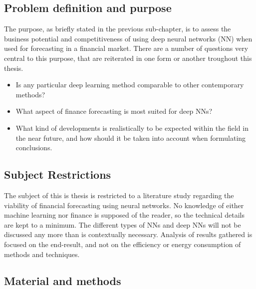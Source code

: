 \subsection{Problem definition and purpose}

The purpose, as briefly stated in the previous sub-chapter, is to assess the business potential and competitiveness of using deep neural networks (NN) when used for forecasting in a financial market. There are a number of questions very central to this purpose, that are reiterated in one form or another troughout this thesis.

\begin{itemize}

\item Is any particular deep learning method comparable to other contemporary methods?

\item What aspect of finance forecasting is most suited for deep NNs?

\item What kind of developments is realistically to be expected within the field in the near future, and how should it be taken into account when formulating conclusions.

\end{itemize}




\subsection{Subject Restrictions}

The subject of this is thesis is restricted to a literature study regarding the viability of financial forecasting using neural networks. No knowledge of either machine learning nor finance is supposed of the reader, so the technical details are kept to a minimum.
The different types of NNs and deep NNs will not be discussed any more than is contextually necessary.
Analysis of results gathered is focused on the end-result, and not on the efficiency or energy consumption of methods and techniques.


\subsection{Material and methods}

